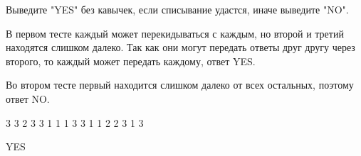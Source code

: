 \outputfmtSection

Выведите "YES" без кавычек, если списывание удастся, иначе выведите "NO".

\explanationSection

В первом тесте каждый может перекидываться с каждым, но второй и третий находятся слишком далеко. Так как они могут передать ответы друг другу через второго, то каждый может передать каждому, ответ YES.

Во втором тесте первый находится слишком далеко от всех остальных, поэтому ответ NO.


\begin{myverbbox}[\small]{\vinput}
    3 3 2
    3 3
    1 1
    1 3
    3 1
    1 2
    2 3
    1 3
\end{myverbbox}

\begin{myverbbox}[\small]{\voutput}
    YES
\end{myverbbox}



